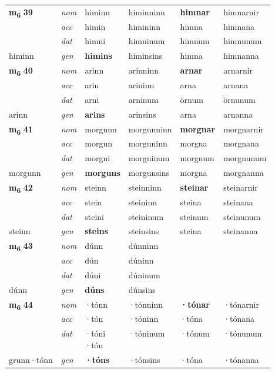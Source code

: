 \begin{longtable}[l]{X>{\footnotesize\itshape}XXXXX}
\multirow{3}{*}{{{\textbf{m{\textsubscript{6}}} \Large{\textbf{39}}}}} & nom & himinn & himinninn & \textbf{himnar} & himnarnir \\*
 & acc & himin & himininn & himna & himnana \\*
 & dat & himni & himninum & himnum & himnunum \\*
 {\footnotesize{himinn}} & gen & \textbf{himins} & himinsins & himna & himnanna \\
\cmidrule{1-6}

\multirow{3}{*}{{{\textbf{m{\textsubscript{6}}} \Large{\textbf{40}}}}} & nom & arinn & arinninn & \textbf{arnar} & arnarnir \\*
 & acc & arin & arininn & arna & arnana \\*
 & dat & arni & arninum & örnum & örnunum \\*
 {\footnotesize{arinn}} & gen & \textbf{arins} & arinsins & arna & arnanna \\
\cmidrule{1-6}

\multirow{3}{*}{{{\textbf{m{\textsubscript{6}}} \Large{\textbf{41}}}}} & nom & morgunn & morgunninn & \textbf{morgnar} & morgnarnir \\*
 & acc & morgun & morguninn & morgna & morgnana \\*
 & dat & morgni & morgninum & morgnum & morgnunum \\*
 {\footnotesize{morgunn}} & gen & \textbf{morguns} & morgunsins & morgna & morgnanna \\
\cmidrule{1-6}

\multirow{3}{*}{{{\textbf{m{\textsubscript{6}}} \Large{\textbf{42}}}}} & nom & steinn & steinninn & \textbf{steinar} & steinarnir \\*
 & acc & stein & steininn & steina & steinana \\*
 & dat & steini & steininum & steinum & steinunum \\*
 {\footnotesize{steinn}} & gen & \textbf{steins} & steinsins & steina & steinanna \\
\cmidrule{1-6}

\multirow{3}{*}{{{\textbf{m{\textsubscript{6}}} \Large{\textbf{43}}}}} & nom & dúnn & dúnninn & \textbf{} &  \\*
 & acc & dún & dúninn &  &  \\*
 & dat & dúni & dúninum &  &  \\*
 {\footnotesize{dúnn}} & gen & \textbf{dúns} & dúnsins &  &  \\
\cmidrule{1-6}

\multirow{3}{*}{{{\textbf{m{\textsubscript{6}}} \Large{\textbf{44}}}}} & nom & ·tónn & ·tónninn & \textbf{·tónar} & ·tónarnir \\*
 & acc & ·tón & ·tóninn & ·tóna & ·tónana \\*
 & dat & \specialcell{·tóni\\  ·tón} & ·tóninum & ·tónum & ·tónunum \\*
 {\footnotesize{grunn\allowbreak ·tónn}} & gen & \textbf{·tóns} & ·tónsins & ·tóna & ·tónanna \\
\cmidrule{1-6}


\end{longtable}
